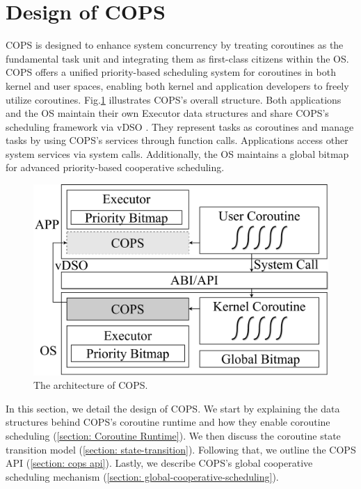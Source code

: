 \documentclass[conference]{IEEEtran}
\begin{document}
\section{Design of COPS}
\label{section: design}

COPS is designed to enhance system concurrency by treating coroutines as the fundamental task unit and integrating them as first-class citizens within the OS. COPS offers a unified priority-based scheduling system for coroutines in both kernel and user spaces, enabling both kernel and application developers to freely utilize coroutines. Fig.\ref{fig:arch} illustrates COPS's overall structure. Both applications and the OS maintain their own Executor data structures and share COPS's scheduling framework via vDSO \cite{michael_kerrisk_vdso7_2023}. They represent tasks as coroutines and manage tasks by using COPS's services through function calls. Applications access other system services via system calls. Additionally, the OS maintains a global bitmap for advanced priority-based cooperative scheduling.

\begin{figure}[tbp]
  \centering
  \includegraphics[width=\linewidth]{assets/arch.pdf}
  \caption{The architecture of COPS.}
  \label{fig:arch}
  \vspace{-1em}
\end{figure}

In this section, we detail the design of COPS. We start by explaining the data structures behind COPS's coroutine runtime and how they enable coroutine scheduling (\ref{section: Coroutine Runtime}). We then discuss the coroutine state transition model (\ref{section: state-transition}). Following that, we outline the COPS API (\ref{section: cops api}). Lastly, we describe COPS's global cooperative scheduling mechanism (\ref{section: global-cooperative-scheduling}).
\end{document}
